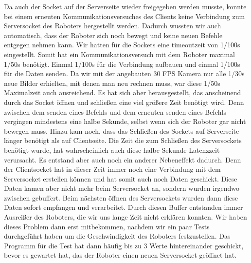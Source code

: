 Da auch der Socket auf der Serverseite wieder freigegeben werden musste, konnte bei einem erneuten Kommunikationsversuches des Clients keine Verbindung zum Serversocket des Roboters hergestellt werden. Dadurch wussten wir auch automatisch, dass der Roboter sich noch bewegt und keine neuen Befehle entgegen nehmen kann. Wir hatten für die Sockets eine timeoutzeit von 1/100s eingestellt. Somit hat ein Kommunikationsversuch mit dem Roboter maximal 1/50s benötigt. Einmal  1/100s für die Verbindung aufbauen und einmal 1/100s für die Daten senden. Da wir mit der angebauten 30 FPS Kamera nur alle 1/30s neue Bilder erhielten, mit denen man neu rechnen muss, war diese 1/50s Maximalzeit auch ausreichend. Es hat sich aber herausgestellt, das anscheinend durch das Socket öffnen und schließen eine viel größere Zeit benötigt wird. Denn zwischen dem senden eines Befehls und dem erneuten senden eines Befehls vergingen mindestens eine halbe Sekunde, selbst wenn sich der Roboter gar nicht bewegen muss. Hinzu kam noch, dass das Schließen des Sockets auf Serverseite länger benötigt als auf Clientseite. Die Zeit die zum Schließen des Serversockets benötigt wurde, hat wahrscheinlich auch diese halbe Sekunde Latenzzeit verursacht. Es entstand aber auch noch ein anderer Nebeneffekt dadurch. Denn der Clientsocket hat in dieser Zeit immer noch eine Verbindung mit dem Serversocket erstellen können und hat somit auch noch Daten geschickt. Diese Daten kamen aber nicht mehr beim Serversocket an, sondern wurden irgendwo zwischen gebuffert. Beim nächsten öffnen des Serversockets wurden dann diese Daten sofort empfangen und verarbeitet. Durch diesen Buffer entstanden immer Ausreißer des Roboters, die wir uns lange Zeit nicht erklären konnten. Wir haben dieses Problem dann erst mitbekommen, nachdem wir ein paar Tests durchgeführt haben um die Geschwindigkeit des Roboters festzustellen. Das Programm für die Test hat dann häufig bis zu 3 Werte hintereinander geschickt, bevor es gewartet hat, das der Roboter einen neuen Serversocket geöffnet hat. 


